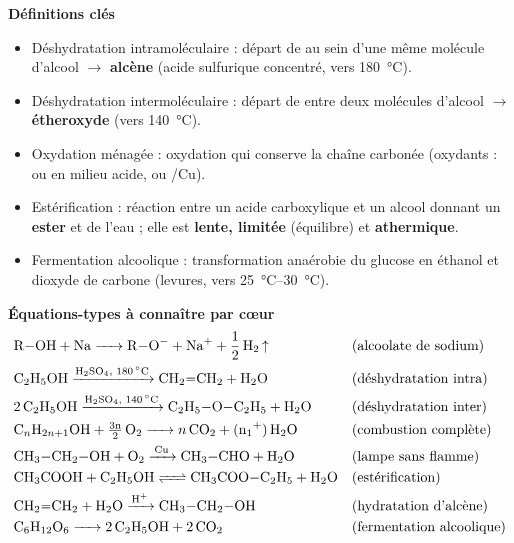 \documentclass[11pt]{article}
\newcommand{\cle}[1]{{\popxbold\color{popdark}#1}}
\begin{document}
\begin{bilan}
\textbf{Définitions clés}
\begin{itemize}
  \item \cle{Déshydratation intramoléculaire} : départ de  au sein d'une même molécule d'alcool $\to$ \textbf{alcène} (acide sulfurique concentré, vers \SI{180}{\celsius}).
  \item \cle{Déshydratation intermoléculaire} : départ de  entre deux molécules d'alcool $\to$ \textbf{étheroxyde} (vers \SI{140}{\celsius}).
  \item \cle{Oxydation ménagée} : oxydation qui conserve la chaîne carbonée (oxydants :  ou  en milieu acide, ou /Cu).
  \item \cle{Estérification} : réaction entre un acide carboxylique et un alcool donnant un \textbf{ester} et de l'eau ; elle est \textbf{lente, limitée} (équilibre) et \textbf{athermique}.
  \item \cle{Fermentation alcoolique} : transformation anaérobie du glucose en éthanol et dioxyde de carbone (levures, vers \SIrange{25}{30}{\celsius}).
\end{itemize}

\textbf{Équations-types à connaître par cœur}
\begin{align*}
&\ce{R-OH + Na -> R-O^- + Na^+ + 1/2 H2 ^} &&\text{(alcoolate de sodium)}\\
&\ce{C2H5OH ->[{\ce{H2SO4}, \SI{180}{\celsius}}] CH2=CH2 + H2O} &&\text{(déshydratation intra)}\\
&\ce{2 C2H5OH ->[{\ce{H2SO4}, \SI{140}{\celsius}}] C2H5-O-C2H5 + H2O} &&\text{(déshydratation inter)}\\
&\ce{C_nH_{2n+1}OH + \tfrac{3n}{2} O2 -> n CO2 + (n+1) H2O} &&\text{(combustion complète)}\\
&\ce{CH3-CH2-OH + O2 ->[Cu] CH3-CHO + H2O} &&\text{(lampe sans flamme)}\\
&\ce{CH3COOH + C2H5OH <=> CH3COO-C2H5 + H2O} &&\text{(estérification)}\\
&\ce{CH2=CH2 + H2O ->[{\ce{H+}}] CH3-CH2-OH} &&\text{(hydratation d'alcène)}\\
&\ce{C6H12O6 -> 2 C2H5OH + 2 CO2} &&\text{(fermentation alcoolique)}
\end{align*}


\end{bilan}
\end{document}
